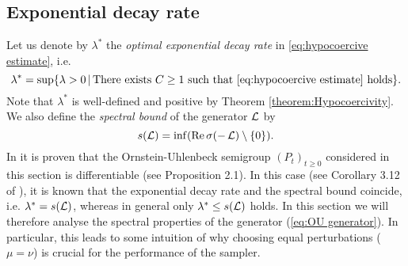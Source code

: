 \subsection{Exponential decay rate}
\label{sec:exp_decay}
Let us denote by $\lambda^{*}$ the \emph{optimal exponential decay rate} in \eqref{eq:hypocoercive estimate}, i.e.
\begin{equation}
\lambda^{*}=\sup\{\lambda > 0 \, \vert \, \text{There exists } C\ge 1 \text{ such that } \eqref{eq:hypocoercive estimate} \text{ holds}\}.
\end{equation}
Note that $\lambda^{*}$ is well-defined and positive by Theorem \ref{theorem:Hypocoercivity}. We also define the \emph{spectral bound} of the generator $\operatorname{\mathcal{L}}$ by
\begin{equation}
s(\operatorname{\mathcal{L}})=\inf(\text{Re}\,\sigma(-\operatorname{\mathcal{L}})\setminus\{0\}).
\end{equation} 
In \cite{Metafune_formula} it is proven that the Ornstein-Uhlenbeck semigroup $(P_t)_{t\ge0}$ considered in this section is differentiable (see Proposition 2.1). In this case (see Corollary 3.12 of \cite{Engel2000Semigroup}), it is known that the exponential decay rate and the spectral bound coincide, i.e. $\lambda^{*}=s(\operatorname{\mathcal{L}})$, whereas in general only $\lambda^{*}\le s(\operatorname{\mathcal{L}})$ holds.
In this section we will therefore analyse the spectral properties of the generator
(\ref{eq:OU generator}). In particular, this leads to some intuition
of why choosing equal perturbations ($\mu=\nu$) is crucial for the
performance of the sampler.

